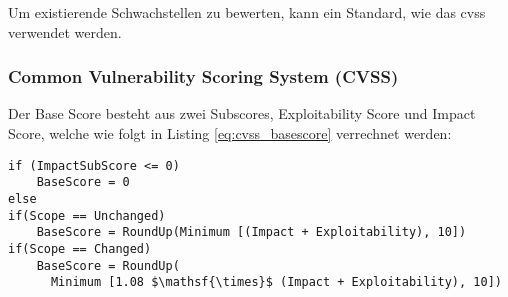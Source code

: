 	\noindent Um existierende Schwachstellen zu bewerten, kann ein Standard, wie das \gls{cvss} verwendet werden.
	
\subsubsection{Common Vulnerability Scoring System (CVSS)}
\label{sec:sota_sa_cvss}
    \noindent Der Base Score besteht aus zwei Subscores, Exploitability Score und Impact Score, welche wie folgt in Listing \ref{eq:cvss_basescore} verrechnet werden:
    \begin{lstlisting}[caption={Berechnung des BaseScore \cite{CVSSspec}},label=eq:cvss_basescore,captionpos=b,mathescape=true]
if (ImpactSubScore <= 0)
    BaseScore = 0
else
if(Scope == Unchanged)
    BaseScore = RoundUp(Minimum [(Impact + Exploitability), 10])
if(Scope == Changed)
    BaseScore = RoundUp(
      Minimum [1.08 $\mathsf{\times}$ (Impact + Exploitability), 10])
    \end{lstlisting}
    
